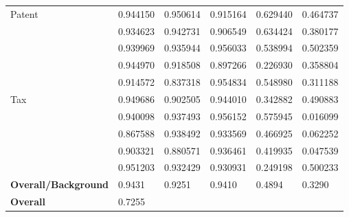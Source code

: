 \documentclass[english, paper=a4]{scrartcl}
\begin{document}
\begin{table}[]
\begin{tabular}{l | p{2cm}| p{2cm}| p{2cm}| p{2cm}| p{2cm} }
Patent & 0.944150 & 0.950614  &0.915164 &0.629440 &0.464737  \\   
		& 0.934623 & 0.942731  &0.906549 &0.634424 &0.380177  \\ 
		& 0.939969 & 0.935944  &0.956033 &0.538994 &0.502359  \\ 
		& 0.944970 & 0.918508  &0.897266 &0.226930 &0.358804  \\ 
		& 0.914572 & 0.837318  &0.954834 &0.548980 &0.311188  \\ \hline 
Tax & 0.949686 & 0.902505  &0.944010 &0.342882 &0.490883  \\   
		& 0.940098 & 0.937493  &0.956152 &0.575945 &0.016099  \\ 
		& 0.867588 & 0.938492  &0.933569 &0.466925 &0.062252  \\ 
		& 0.903321 & 0.880571  &0.936461 &0.419935 &0.047539  \\ 
		& 0.951203 & 0.932429  &0.930931 &0.249198 &0.500233  \\ 	\hline \hline 
\textbf{Overall/Background} &0.9431 & 0.9251 & 0.9410 & 0.4894 &0.3290\\ \hline 
\textbf{Overall}&	 0.7255					            
\end{tabular}
\end{table}

\newpage


\end{document}
